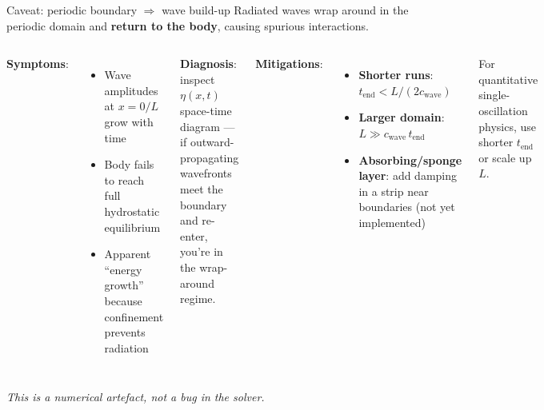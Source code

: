 \documentclass[aspectratio=169, 10pt]{beamer}
\begin{document}
\begin{frame}{Caveat: periodic boundary $\Rightarrow$ wave build-up}
\small
Radiated waves wrap around in the periodic domain and \textbf{return to the body}, causing spurious interactions.

\vspace{0.3em}
\begin{columns}[T]
\textbf{Symptoms}:
\begin{itemize}
\item Wave amplitudes at $x = 0 / L$ grow with time
\item Body fails to reach full hydrostatic equilibrium
\item Apparent ``energy growth'' because confinement prevents radiation
\end{itemize}

\textbf{Diagnosis}: inspect $\eta(x,t)$ space-time diagram — if outward-propagating wavefronts meet the boundary and re-enter, you're in the wrap-around regime.

\textbf{Mitigations}:
\begin{itemize}
\item \textbf{Shorter runs}: $t_{\text{end}} < L/(2 c_{\text{wave}})$
\item \textbf{Larger domain}: $L \gg c_{\text{wave}}\,t_{\text{end}}$
\item \textbf{Absorbing/sponge layer}: add damping in a strip near boundaries (not yet implemented)
\end{itemize}

\vspace{0.3em}
For quantitative single-oscillation physics, use shorter $t_{\text{end}}$ or scale up $L$.
\end{columns}

\vspace{0.8em}
\small \textit{This is a numerical artefact, not a bug in the solver.}
\end{frame}

\end{document}

